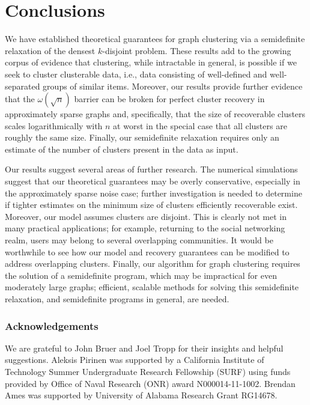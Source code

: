 \documentclass[twoside,11pt]{article}
\newcommand{\0}{\bs{0}}
\begin{document}
{\section{Conclusions}
\label{sec: con}
We have established theoretical guarantees for graph clustering via a semidefinite relaxation of the densest \(k\)-disjoint problem.
These results add to the growing corpus of evidence that clustering, while intractable in general,
is possible if we seek to cluster clusterable data, i.e., data consisting of well-defined and well-separated groups of similar items.
Moreover, our results provide further evidence that the \(\omega(\sqrt{n})\) barrier can be broken for perfect cluster recovery in approximately sparse graphs and, specifically, that the size of recoverable clusters
scales logarithmically with \(n\) at worst in the special case that all clusters
are roughly the same size.
Finally, our semidefinite relaxation requires only an estimate of the
number of clusters present in the data as input.

Our results suggest several areas of further research.
The numerical simulations suggest that our theoretical guarantees may be overly conservative, especially in the approximately
sparse noise case;
further investigation is needed to determine if tighter estimates on the minimum size of clusters efficiently recoverable
exist.
Moreover, our model assumes clusters are disjoint. This is clearly not met in many practical applications; for example,
returning to the social networking realm,
users may belong to several overlapping communities. 
It would be worthwhile to see how our model and recovery guarantees can be modified to address overlapping clusters.
Finally, our algorithm for graph clustering requires the solution of a semidefinite program, which may be impractical for 
even moderately large graphs; efficient, scalable methods for solving this semidefinite relaxation, and semidefinite programs in general, are needed.

\subsubsection*{Acknowledgements}
{We are grateful to John Bruer and Joel Tropp for their insights and helpful suggestions.
Aleksis Pirinen was supported by a California Institute of Technology Summer Undergraduate Research Fellowship (SURF) using funds provided by Office of Naval Research (ONR) award N000014-11-1002. Brendan Ames was supported by University of Alabama Research Grant RG14678.}
%
\newpage
\appendix

}
\end{document}

